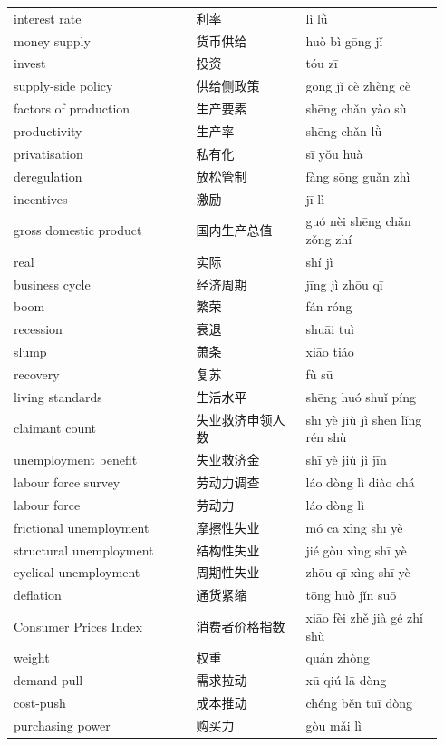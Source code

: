 \documentclass[11pt]{article}
\begin{document}
\begin{longtable}{@{}p{0.40\linewidth}p{0.24\linewidth}p{0.30\linewidth}@{}}
interest rate & 利率 & lì lǜ \\
money supply & 货币供给 & huò bì gōng jǐ \\
invest & 投资 & tóu zī \\
supply-side policy & 供给侧政策 & gōng jǐ cè zhèng cè \\
factors of production & 生产要素 & shēng chǎn yào sù \\
productivity & 生产率 & shēng chǎn lǜ \\
privatisation & 私有化 & sī yǒu huà \\
deregulation & 放松管制 & fàng sōng guǎn zhì \\
incentives & 激励 & jī lì \\
gross domestic product & 国内生产总值 & guó nèi shēng chǎn zǒng zhí \\
real & 实际 & shí jì \\
business cycle & 经济周期 & jīng jì zhōu qī \\
boom & 繁荣 & fán róng \\
recession & 衰退 & shuāi tuì \\
slump & 萧条 & xiāo tiáo \\
recovery & 复苏 & fù sū \\
living standards & 生活水平 & shēng huó shuǐ píng \\
claimant count & 失业救济申领人数 & shī yè jiù jì shēn lǐng rén shù \\
unemployment benefit & 失业救济金 & shī yè jiù jì jīn \\
labour force survey & 劳动力调查 & láo dòng lì diào chá \\
labour force & 劳动力 & láo dòng lì \\
frictional unemployment & 摩擦性失业 & mó cā xìng shī yè \\
structural unemployment & 结构性失业 & jié gòu xìng shī yè \\
cyclical unemployment & 周期性失业 & zhōu qī xìng shī yè \\
deflation & 通货紧缩 & tōng huò jǐn suō \\
Consumer Prices Index & 消费者价格指数 & xiāo fèi zhě jià gé zhǐ shù \\
weight & 权重 & quán zhòng \\
demand-pull & 需求拉动 & xū qiú lā dòng \\
cost-push & 成本推动 & chéng běn tuī dòng \\
purchasing power & 购买力 & gòu mǎi lì \\
\end{longtable}
\end{document}
